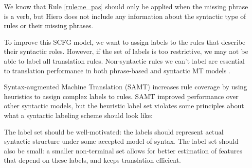 \documentclass{article}
\begin{document}
We know that Rule \ref{rule:ne_pas} should only be applied when the missing phrase is a verb, but Hiero does not include any information about the syntactic type of rules or their missing phrases.

To improve this SCFG model, we want to assign labels to the rules that describe their syntactic roles. However, if the set of labels is too restrictive, we may not be able to label all translation rules. Non-syntactic rules we can't label are essential to translation performance in both phrase-based \cite{koehn-och-marcu-2003} and syntactic MT models \cite{deneefe-syntax-and-phrase-mt}.


Syntax-augmented Machine Translation (SAMT) \cite{samt-wmt06} increases rule coverage by using heuristics to assign complex labels to rules. %
SAMT improved performance over other syntactic models, but the heuristic label set violates some principles about what a syntactic labeling scheme should look like:

The label set should be well-motivated: the labels should represent actual syntactic structure under some accepted model of syntax. The label set should also be small: a smaller non-terminal set allows for better estimation of features that depend on these labels, and keeps translation efficient. 
%
\end{document}
